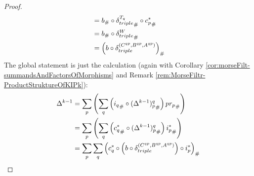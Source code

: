 \begin{proof}
\begin{align*}
		&={b}_{\#}\circ {\delta_{triple}^{T_q}}_{\#} \circ {c^*_p}_{\#}\\
		&={b}_{\#}\circ {\delta_{triple}^{W}}_{\#}\\
		&={\left(b\circ \delta_{triple}^{(C^{qp},B^{qp},A^{qp})}\right)}_{\#}
	\end{align*}
	The global statement is just the calculation (again with Corollary \ref{cor:morseFilt-summandsAndFactorsOfMorphisms} and  Remark \ref{rem:MorseFiltr-ProductStruktureOfKIPk}): 
	\begin{align*}
			 \Delta^{k-1}
			 &=\sum_p\left(\sum_q \left({i_q}_{\#} \circ {(\Delta^{k-1})^{q}_p}_{\#}\right){pr_p}_{\#}\right)\\
			 &=\sum_p\left(\sum_q \left({c^*_q}_{\#} \circ {(\Delta^{k-1})^{q}_p}_{\#}\right){i^*_p}_{\#}\right)\\
			 &=\sum_p \sum_q { \left(c^*_q\circ \left(b\circ \delta_{triple}^{(C^{qp},B^{qp},A^{qp})}\right) \circ i^*_p\right)}_{\#}
	\end{align*}
\end{proof}

